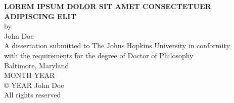\thispagestyle{empty}
\begin{center}
\singlespacing    
{\large \MakeUppercase{\textbf{Lorem ipsum dolor sit amet consectetuer adipiscing elit}}}
%
%
\\ \vspace{1in}             %
%
%
\singlespacing              %
by \\
John Doe                    %
%
%
\\ \vspace{1.5in}           %
%
%
A dissertation submitted to The Johns Hopkins University in conformity\\
with the requirements for the degree of Doctor of Philosophy 
%
%
\\ \vspace{0.5in}           %
%
%
Baltimore, Maryland\\       %
MONTH YEAR                  %
%
%
\\ \vspace{2.75in}          %
%
%
{\copyright{} YEAR John Doe \\
All rights reserved}

\end{center}
